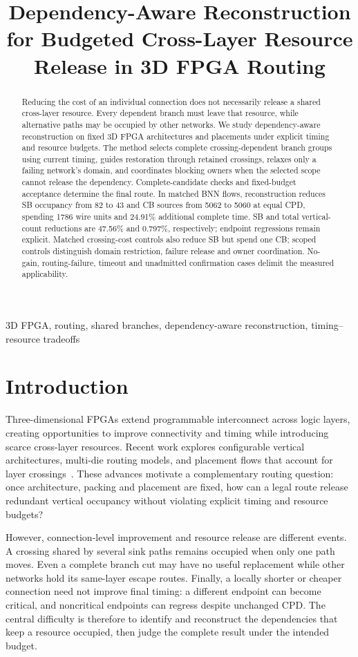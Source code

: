 \documentclass[conference,10pt]{IEEEtran}
\title{Dependency-Aware Reconstruction for Budgeted Cross-Layer Resource Release in 3D FPGA Routing}
\author{\IEEEauthorblockN{Anonymous submission}}
\begin{document}
\maketitle
\begin{abstract}
Reducing the cost of an individual connection does not necessarily release a shared cross-layer resource. Every dependent branch must leave that resource, while alternative paths may be occupied by other networks. We study dependency-aware reconstruction on fixed 3D FPGA architectures and placements under explicit timing and resource budgets. The method selects complete crossing-dependent branch groups using current timing, guides restoration through retained crossings, relaxes only a failing network's domain, and coordinates blocking owners when the selected scope cannot release the dependency. Complete-candidate checks and fixed-budget acceptance determine the final route. In matched BNN flows, reconstruction reduces SB occupancy from 82 to 43 and CB sources from 5062 to 5060 at equal CPD, spending 1786 wire units and 24.91\% additional complete time. SB and total vertical-count reductions are 47.56\% and 0.797\%, respectively; endpoint regressions remain explicit. Matched crossing-cost controls also reduce SB but spend one CB; scoped controls distinguish domain restriction, failure release and owner coordination. No-gain, routing-failure, timeout and unadmitted confirmation cases delimit the measured applicability.
\end{abstract}
\begin{IEEEkeywords}
3D FPGA, routing, shared branches, dependency-aware reconstruction, timing--resource tradeoffs
\end{IEEEkeywords}

\section{Introduction}
Three-dimensional FPGAs extend programmable interconnect across logic layers, creating opportunities to improve connectivity and timing while introducing scarce cross-layer resources. Recent work explores configurable vertical architectures, multi-die routing models, and placement flows that account for layer crossings~\cite{lazagna,multidie,flatland}. These advances motivate a complementary routing question: once architecture, packing and placement are fixed, how can a legal route release redundant vertical occupancy without violating explicit timing and resource budgets?

However, connection-level improvement and resource release are different events. A crossing shared by several sink paths remains occupied when only one path moves. Even a complete branch cut may have no useful replacement while other networks hold its same-layer escape routes. Finally, a locally shorter or cheaper connection need not improve final timing: a different endpoint can become critical, and noncritical endpoints can regress despite unchanged CPD. The central difficulty is therefore to identify and reconstruct the dependencies that keep a resource occupied, then judge the complete result under the intended budget.
\end{document}
